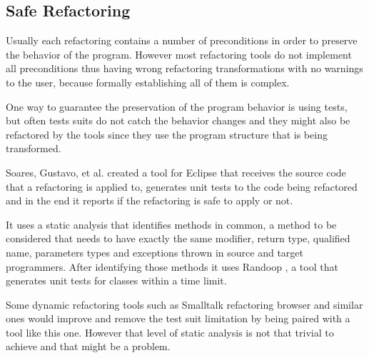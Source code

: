 
\subsection{Safe Refactoring}

Usually each refactoring contains a number of preconditions in order to preserve the behavior of the program. 
However most refactoring tools do not implement all preconditions thus having wrong refactoring transformations with no warnings to the user, because formally establishing all of them is complex.

One way to guarantee the preservation of the program behavior is using tests, but often tests suits do not catch the behavior changes and they might also be refactored by the tools since they use the program structure that is being transformed.

Soares, Gustavo, et al. \cite{soares2010making} created a tool for Eclipse that receives the source code that a refactoring is applied to, generates unit tests to the code being refactored and in the end it reports if the refactoring is safe to apply or not.

It uses a static analysis that identifies methods in common, a method to be considered that needs to have exactly the same modifier, return type, qualified name, parameters types and exceptions thrown in source and target programmers.
After identifying those methods it uses Randoop \cite{pacheco2007feedback},  %
 a tool that generates unit tests for classes within a time limit.

Some dynamic refactoring tools such as Smalltalk refactoring browser and similar ones would improve and remove the test suit limitation by being paired with a tool like this one. However that level of static analysis is not that trivial to achieve and that might be a problem. %